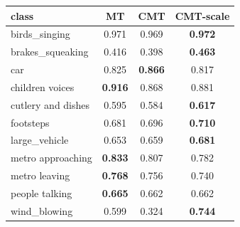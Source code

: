 \begin{tabular}{l c c c}
\toprule
class & MT & CMT & CMT-scale \\
\midrule
birds\_singing & 0.971 & 0.969 & \textbf{0.972} \\
brakes\_squeaking & 0.416 & 0.398 & \textbf{0.463} \\
car & 0.825 & \textbf{0.866} & 0.817 \\
children voices & \textbf{0.916} & 0.868 & 0.881 \\
cutlery and dishes & 0.595 & 0.584 & \textbf{0.617} \\
footsteps & 0.681 & 0.696 & \textbf{0.710} \\
large\_vehicle & 0.653 & 0.659 & \textbf{0.681} \\
metro approaching & \textbf{0.833} & 0.807 & 0.782 \\
metro leaving & \textbf{0.768} & 0.756 & 0.740 \\
people talking & \textbf{0.665} & 0.662 & 0.662 \\
wind\_blowing & 0.599 & 0.324 & \textbf{0.744} \\
\bottomrule
\end{tabular}